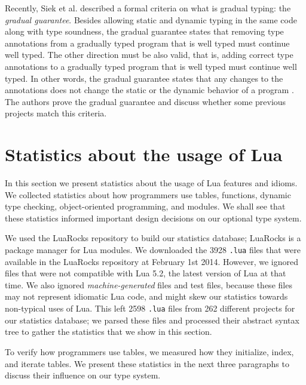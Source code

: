 Recently, Siek et al. \cite{siek2015refined} described a formal
criteria on what is gradual typing: the \emph{gradual guarantee}.
Besides allowing static and dynamic typing in the same code
along with type soundness, the gradual guarantee states that
removing type annotations from a gradually typed program that is
well typed must continue well typed.
The other direction must be also valid, that is, adding correct type
annotations to a gradually typed program that is well typed must
continue well typed.
In other words, the gradual guarantee states that any changes to
the annotations does not change the static or the dynamic behavior
of a program \cite{siek2015refined}.
The authors prove the gradual guarantee and discuss whether
some previous projects match this criteria.

\section{Statistics about the usage of Lua}
\label{sec:statistics}

In this section we present statistics about the usage of Lua
features and idioms.
We collected statistics about how programmers use tables, functions,
dynamic type checking, object-oriented programming, and modules.
We shall see that these statistics informed important design decisions
on our optional type system.

We used the LuaRocks repository to build our statistics database;
LuaRocks \cite{hisham2013luarocks} is a package manager for Lua
modules.
We downloaded the 3928 \texttt{.lua} files that were available in
the LuaRocks repository at February 1st 2014.
However, we ignored files that were not compatible with Lua 5.2,
the latest version of Lua at that time.
We also ignored \emph{machine-generated} files and test files,
because these files may not represent idiomatic Lua code,
and might skew our statistics towards non-typical uses of Lua.
This left 2598 \texttt{.lua} files from 262 different projects for
our statistics database;
we parsed these files and processed their abstract syntax tree
to gather the statistics that we show in this section.

To verify how programmers use tables, we measured how they
initialize, index, and iterate tables.
We present these statistics in the next three paragraphs to discuss
their influence on our type system.

